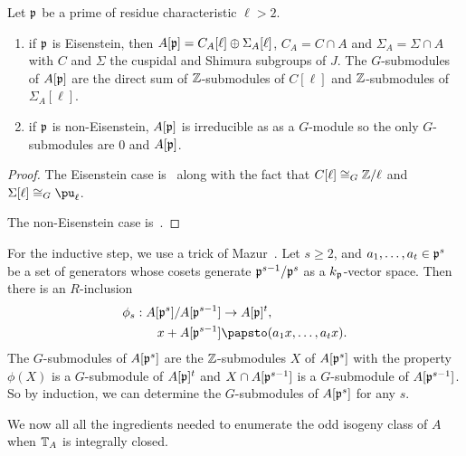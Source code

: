 \documentclass{article}
\begin{document}
\begin{proposition}[Mazur]\label{prop:all_G_subs}
    Let $\mathfrak{p}$ be a prime of residue characteristic $\ell>2$.
    \begin{enumerate}
        \item 
            if $\mathfrak{p}$ is Eisenstein, then $A[\mathfrak{p}]=C_A[\ell]\oplus \Sigma_A[\ell]$,
            $C_A=C\cap A$ and $\Sigma_A=\Sigma \cap A$ with $C$ and $\Sigma$
            the cuspidal and Shimura subgroups of $J$. The $G$-submodules of
            $A[\mathfrak{p}]$ are the direct sum of $\mathbb{Z}$-submodules of $C[\ell]$ and
            $\mathbb{Z}$-submodules of $\Sigma_A[\ell]$.
        \item
            if $\mathfrak{p}$ is non-Eisenstein, $A[\mathfrak{p}]$ is irreducible as as a
            $G$-module so the only $G$-submodules are $0$ and $A[\mathfrak{p}]$.
    \end{enumerate}
\end{proposition}
\begin{proof}
    The Eisenstein case is~\cite[Corollary 16.3]{mazur:eisenstein} along with
    the fact that $C[\ell]\cong_G \mathbb{Z}/\ell$ and $\Sigma[\ell]\isom_G \pu_\ell$.

    The non-Eisenstein case is~\cite[Propositon 14.2]{mazur:eisenstein}.
\end{proof}

For the inductive step, we use a trick of Mazur~\cite[pg.
112]{mazur:eisenstein}. Let $s\geq 2$, and
$a_1,\ldots,a_t\in \mathfrak{p}^s$ be a set of generators whose cosets generate
$\mathfrak{p}^{s-1}/\mathfrak{p}^s$ as a $k_{\mathfrak{p}}$-vector space. Then there is an $R$-inclusion
\begin{align*}
    \phi_s: A[\p^s]/A[\p^{s-1}] & \to A[\p]^t, \\
    x+A[\p^{s-1}] & \papsto (a_1x,\ldots,a_tx).
\end{align*}
The $G$-submodules of $A[\mathfrak{p}^s]$ are the $\mathbb{Z}$-submodules $X$ of $A[\mathfrak{p}^s]$ with
the property $\phi(X)$ is a $G$-submodule of $A[\mathfrak{p}]^t$ and $X\cap A[\mathfrak{p}^{s-1}]$
is a $G$-submodule of $A[\mathfrak{p}^{s-1}]$. So by induction, we can determine the
$G$-submodules of $A[\mathfrak{p}^s]$ for any $s$. 

We now all all the ingredients needed to enumerate the odd isogeny class of
$A$ when $\mathbb{T}_A$ is integrally closed.
\end{document}
